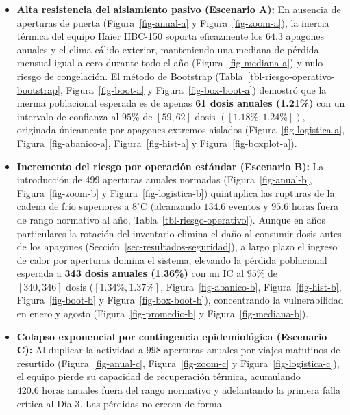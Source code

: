 \documentclass[
  spanish,
  us-letterpaper,
]{scrreprt}
\providecommand{\tightlist}{%
  \setlength{\itemsep}{0pt}\setlength{\parskip}{0pt}}
\numberwithin{equation}{section}
\theoremstyle{plain}
\theoremstyle{plain}
\theoremstyle{definition}
\theoremstyle{plain}
\theoremstyle{remark}
\begin{document}
\begin{itemize}
\tightlist
\item
  \textbf{Alta resistencia del aislamiento pasivo (Escenario A):} En
  ausencia de aperturas de puerta (Figura~\ref{fig-anual-a} y
  Figura~\ref{fig-zoom-a}), la inercia térmica del equipo Haier HBC-150
  soporta eficazmente los \(64.3\) apagones anuales y el clima cálido
  exterior, manteniendo una mediana de pérdida mensual igual a cero
  durante todo el año (Figura~\ref{fig-mediana-a}) y nulo riesgo de
  congelación. El método de Bootstrap
  (Tabla~\ref{tbl-riesgo-operativo-bootstrap}, Figura~\ref{fig-boot-a} y
  Figura~\ref{fig-box-boot-a}) demostró que la merma poblacional
  esperada es de apenas \textbf{61 dosis anuales (1.21\%)} con un
  intervalo de confianza al \(95\%\) de \([59, 62]\text{ dosis}\)
  \(\left( [1.18\%, 1.24\%] \right)\), originada únicamente por apagones
  extremos aislados (Figura~\ref{fig-logistica-a},
  Figura~\ref{fig-abanico-a}, Figura~\ref{fig-hist-a} y
  Figura~\ref{fig-boxplot-a}).
\item
  \textbf{Incremento del riesgo por operación estándar (Escenario B):}
  La introducción de \(499\) aperturas anuales normadas
  (Figura~\ref{fig-anual-b}, Figura~\ref{fig-zoom-b} y
  Figura~\ref{fig-logistica-b}) quintuplica las rupturas de la cadena de
  frío superiores a \(8^\circ\text{C}\) (alcanzando
  \(134.6\text{ eventos}\) y \(95.6\text{ horas}\) fuera de rango
  normativo al año, Tabla~\ref{tbl-riesgo-operativo}). Aunque en años
  particulares la rotación del inventario elimina el daño al consumir
  dosis antes de los apagones (Sección~\ref{sec-resultados-seguridad}),
  a largo plazo el ingreso de calor por aperturas domina el sistema,
  elevando la pérdida poblacional esperada a \textbf{343 dosis anuales
  (1.36\%)} con un IC al \(95\%\) de \([340, 346]\text{ dosis}\)
  (\([1.34\%, 1.37\%]\), Figura~\ref{fig-abanico-b},
  Figura~\ref{fig-hist-b}, Figura~\ref{fig-boot-b} y
  Figura~\ref{fig-box-boot-b}), concentrando la vulnerabilidad en enero
  y agosto (Figura~\ref{fig-promedio-b} y Figura~\ref{fig-mediana-b}).
\item
  \textbf{Colapso exponencial por contingencia epidemiológica (Escenario
  C):} Al duplicar la actividad a \(998\) aperturas anuales por viajes
  matutinos de resurtido (Figura~\ref{fig-anual-c},
  Figura~\ref{fig-zoom-c} y Figura~\ref{fig-logistica-c}), el equipo
  pierde su capacidad de recuperación térmica, acumulando
  \(420.6\text{ horas}\) anuales fuera del rango normativo y adelantando
  la primera falla crítica al Día 3. Las pérdidas no crecen de forma

\end{itemize}
\end{document}
